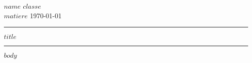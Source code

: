 \documentclass[twoside, 11pt]{article}
\begin{document}
$name$ \hfill $classe$ \\
$matiere$ \hfill \today\\
\hrule
\vspace{0.1cm}
\begin{center}
\large $title$
\end{center}
\vspace{0.1cm}
\hrule

$body$
\end{document}
